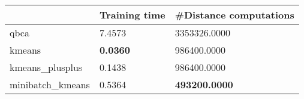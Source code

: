 \begin{table}[htbp]
\centering
\begin{tabular}{lll}
\toprule
 & Training time & #Distance computations \\
\midrule
qbca & 7.4573 & 3353326.0000 \\
kmeans & \textbf{0.0360} & 986400.0000 \\
kmeans_plusplus & 0.1438 & 986400.0000 \\
minibatch_kmeans & 0.5364 & \textbf{493200.0000} \\
\bottomrule
\end{tabular}
\end{table}
